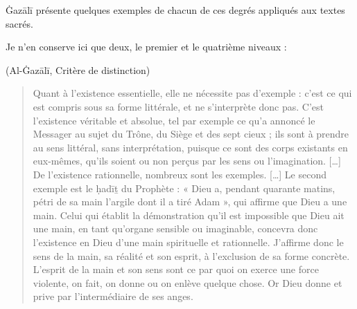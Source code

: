 Ġazālī présente quelques exemples de chacun de ces degrés appliqués aux
textes sacrés.

Je n'en conserve ici que deux, le premier et le quatrième niveaux :

\begin{Ex}
 (Al-Ġazālī, Critère de distinction)

\begin{quote}
    Quant à l’existence essentielle, elle ne nécessite pas d’exemple : c’est ce qui est compris sous sa forme littérale, et ne s’interprète donc pas. C’est l’existence véritable et absolue, tel par exemple ce qu’a annoncé le Messager au sujet du Trône, du Siège et des sept cieux ; ils sont à prendre au sens littéral, sans interprétation, puisque ce sont des corps existants en eux-mêmes, qu’ils soient ou non perçus par les sens ou l’imagination. […] De l’existence rationnelle, nombreux sont les exemples. […] Le second exemple est le ḥadīṯ du Prophète : « Dieu a, pendant quarante matins, pétri de sa main l’argile dont il a tiré Adam », qui affirme que Dieu a une main. Celui qui établit la démonstration qu’il est impossible que Dieu ait une main, en tant qu’organe sensible ou imaginable, concevra donc l’existence en Dieu d’une main spirituelle et rationnelle. J’affirme donc le sens de la main, sa réalité et son esprit, à l’exclusion de sa forme concrète. L’esprit de la main et son sens sont ce par quoi on exerce une force violente, on fait, on donne ou on enlève quelque chose. Or Dieu donne et prive par l’intermédiaire de ses anges.
\end{quote}  
\end{Ex}

